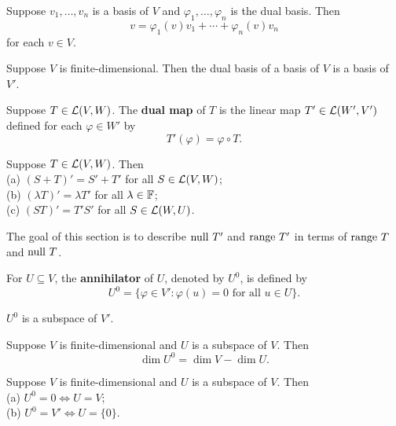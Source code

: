 \documentclass{extarticle}
\begin{document}
\begin{thm}
    Suppose \(v_1, \ldots, v_n\) is a basis of \(V\) and \(\varphi_1, \ldots, \varphi_n\)
    is the dual basis. Then 
    \[v = \varphi_1(v) v_1 + \cdots + \varphi_n(v) v_n\]
    for each \(v \in V\). 
\end{thm}

\begin{thm}
    Suppose \(V\) is finite-dimensional. Then the dual basis of a basis of \(V\) is a basis 
    of \(V'\). 
\end{thm}

\begin{definition}
    Suppose \(T \in \mathcal{L}(V, W)\). The \textbf{dual map} of \(T\) is the linear map 
    \(T' \in \mathcal{L}(W', V')\) defined for each \(\varphi \in W'\) by 
    \[T'(\varphi) = \varphi \circ T.\]
\end{definition}

\begin{corollary}
    Suppose \(T \in \mathcal{L}(V, W)\). Then \\ 
    (a) \((S + T)' = S' + T'\) for all \(S \in \mathcal{L}(V, W)\); \\ 
    (b) \((\lambda T)' = \lambda T'\) for all \(\lambda \in \mathbb{F}\); \\ 
    (c) \((ST)' = T'S'\) for all \(S \in \mathcal{L}(W, U)\). 
\end{corollary}

The goal of this section is to describe \(\text{null } T'\) and \(\text{range } T'\) in terms of 
\(\text{range } T\) and \(\text{null } T\). 

\begin{definition}[annihilator, \(U^0\)]
    For \(U \subseteq V\), the \textbf{annihilator} of \(U\), denoted by \(U^0\), is 
    defined by 
    \[U^0 = \{\varphi \in V' \colon \varphi(u) = 0 \text{ for all } u \in U\}.\]
\end{definition}

\begin{remark}
    \(U^0\) is a subspace of \(V'\). 
\end{remark}

\begin{thm}
    Suppose \(V\) is finite-dimensional and \(U\) is a subspace of \(V\). Then 
    \[\dim U^0 = \dim V - \dim U.\]
\end{thm}


\begin{lemma}
    Suppose \(V\) is finite-dimensional and \(U\) is a subspace of \(V\). Then \\ 
    (a) \(U^0 = 0 \Leftrightarrow U = V\); \\ 
    (b) \(U^0 = V' \Leftrightarrow U = \{0\}\). 
\end{lemma}
\end{document}
